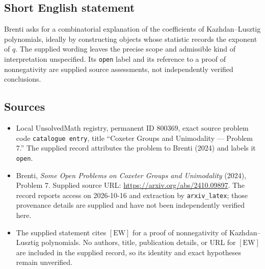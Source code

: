\documentclass[11pt]{article}
\begin{document}
\subsection{Short English statement}
Brenti asks for a combinatorial explanation of the coefficients of Kazhdan--Lusztig polynomials, ideally by constructing objects whose statistic records the exponent of \(q\). The supplied wording leaves the precise scope and admissible kind of interpretation unspecified. Its \texttt{open} label and its reference to a proof of nonnegativity are supplied source assessments, not independently verified conclusions.
\subsection{Sources}
\begin{itemize}
\item Local UnsolvedMath registry, permanent ID \(800369\), exact source problem code \texttt{catalogue entry}, title ``Coxeter Groups and Unimodality --- Problem 7.'' The supplied record attributes the problem to Brenti (2024) and labels it \texttt{open}.
\item Brenti, \emph{Some Open Problems on Coxeter Groups and Unimodality} (2024), Problem 7. Supplied source URL: \url{https://arxiv.org/abs/2410.09897}. The record reports access on 2026-10-16 and extraction by \texttt{arxiv\_latex}; those provenance details are supplied and have not been independently verified here.
\item The supplied statement cites \([\mathrm{EW}]\) for a proof of nonnegativity of Kazhdan--Lusztig polynomials. No authors, title, publication details, or URL for \([\mathrm{EW}]\) are included in the supplied record, so its identity and exact hypotheses remain unverified.
\end{itemize}
\end{document}
